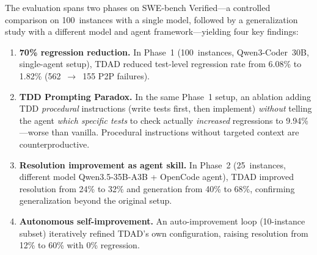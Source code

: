 \documentclass[sigconf,nonacm]{acmart}
\begin{document}
The evaluation spans two phases on SWE-bench Verified---a controlled
comparison on 100~instances with a single model, followed by a
generalization study with a different model and agent framework---yielding
four key findings:

\begin{enumerate}
  \item \textbf{70\% regression reduction.}
    In Phase~1 (100~instances, Qwen3-Coder~30B, single-agent setup),
    \textsc{TDAD} reduced test-level regression rate from
    6.08\% to 1.82\% (562~$\to$~155 P2P failures).
  \item \textbf{TDD Prompting Paradox.}
    In the same Phase~1 setup, an ablation adding TDD \emph{procedural}
    instructions (write tests first, then implement) \emph{without}
    telling the agent \emph{which specific tests} to check actually
    \emph{increased} regressions to 9.94\%---worse than vanilla.
    Procedural instructions without targeted context are counterproductive.
  \item \textbf{Resolution improvement as agent skill.}
    In Phase~2 (25~instances, different model Qwen3.5-35B-A3B + OpenCode agent),
    \textsc{TDAD} improved resolution from 24\% to 32\% and generation
    from 40\% to 68\%, confirming generalization beyond the original setup.
  \item \textbf{Autonomous self-improvement.}
    An auto-improvement loop (10-instance subset) iteratively refined
    \textsc{TDAD}'s own configuration, raising resolution from 12\% to
    60\% with 0\% regression.
\end{enumerate}
\end{document}
